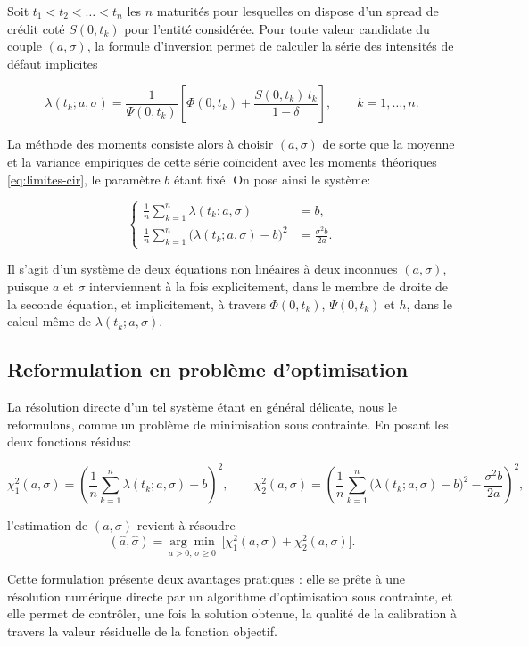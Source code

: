 Soit $t_1 < t_2 < \dots < t_n$ les $n$ maturités pour lesquelles on dispose d'un spread de crédit coté $S(0,t_k)$ pour l'entité considérée. Pour toute valeur candidate du couple $(a,\sigma)$, la formule d'inversion permet de calculer la série des intensités de défaut implicites

\[
\lambda(t_k; a,\sigma) = \frac{1}{\Psi(0,t_k)}\left[\Phi(0,t_k) + \frac{S(0,t_k)\, t_k}{1-\delta}\right], \qquad k=1,\dots,n.
\]

La méthode des moments consiste alors à choisir $(a,\sigma)$ de sorte que la moyenne et la variance empiriques de cette série coïncident avec les moments théoriques \eqref{eq:limites-cir}, le paramètre $b$ étant fixé. On pose ainsi le système:

\begin{equation}
\left\{
\begin{aligned}
\frac{1}{n}\sum_{k=1}^{n} \lambda(t_k; a,\sigma) &= b, \\[4pt]
\frac{1}{n}\sum_{k=1}^{n} \Big(\lambda(t_k; a,\sigma) - b\Big)^2 &= \frac{\sigma^2 b}{2a}.
\end{aligned}
\right.
\label{eq:systeme-moments}
\end{equation}

Il s'agit d'un système de deux équations non linéaires à deux inconnues $(a,\sigma)$, puisque $a$ et $\sigma$ interviennent à la fois explicitement, dans le membre de droite de la seconde équation, et implicitement, à travers $\Phi(0,t_k)$, $\Psi(0,t_k)$ et $h$, dans le calcul même de $\lambda(t_k;a,\sigma)$.


\subsection{Reformulation en problème d'optimisation}

La résolution directe d'un tel système étant en général délicate, nous le reformulons, comme un problème de minimisation sous contrainte. En posant les deux fonctions résidus:

\[
\chi_1^2(a,\sigma) = \left(\frac{1}{n}\sum_{k=1}^{n} \lambda(t_k;a,\sigma) - b\right)^2, \qquad
\chi_2^2(a,\sigma) = \left(\frac{1}{n}\sum_{k=1}^{n} \big(\lambda(t_k;a,\sigma)-b\big)^2 - \frac{\sigma^2 b}{2a}\right)^2,
\]

l'estimation de $(a,\sigma)$ revient à résoudre
\[
(\hat{a}, \hat{\sigma}) = \underset{a>0,\, \sigma \geq 0}{\arg\min} \; \Big[\chi_1^2(a,\sigma) + \chi_2^2(a,\sigma)\Big].
\]

Cette formulation présente deux avantages pratiques : elle se prête à une résolution numérique directe par un algorithme d'optimisation sous contrainte, et elle permet de contrôler, une fois la solution obtenue, la qualité de la calibration à travers la valeur résiduelle de la fonction objectif.

